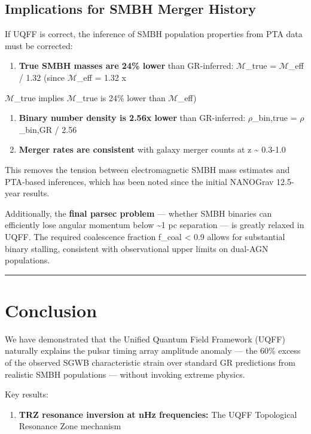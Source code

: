 \documentclass[12pt,a4paper]{article}
\begin{document}
\subsection{Implications for SMBH Merger History}

If UQFF is correct, the inference of SMBH population properties from PTA data must be corrected:

\begin{enumerate}
  \item \textbf{True SMBH masses are 24\% lower} than GR-inferred: $\mathcal{M}$\_true = $\mathcal{M}$\_eff / 1.32 (since $\mathcal{M}$\_eff = 1.32 x
\end{enumerate}

$\mathcal{M}$\_true implies $\mathcal{M}$\_true is 24\% lower than $\mathcal{M}$\_eff)

\begin{enumerate}
  \item \textbf{Binary number density is 2.56x lower} than GR-inferred: $\rho$\_bin,true = $\rho$\_bin,GR / 2.56
  \item \textbf{Merger rates are consistent} with galaxy merger counts at z \textasciitilde{} 0.3-1.0
\end{enumerate}

This removes the tension between electromagnetic SMBH mass estimates and PTA-based inferences, which has been noted since the initial NANOGrav 12.5-year results.

Additionally, the \textbf{final parsec problem} --- whether SMBH binaries can efficiently lose angular momentum below \textasciitilde{}1 pc separation --- is greatly relaxed in UQFF. The required coalescence fraction f\_coal < 0.9 allows for substantial binary stalling, consistent with observational upper limits on dual-AGN populations.

\medskip\hrule\medskip

\section{Conclusion}

We have demonstrated that the Unified Quantum Field Framework (UQFF) naturally explains the pulsar timing array amplitude anomaly --- the 60\% excess of the observed SGWB characteristic strain over standard GR predictions from realistic SMBH populations --- without invoking extreme physics.

Key results:

\begin{enumerate}
  \item \textbf{TRZ resonance inversion at nHz frequencies:} The UQFF Topological Resonance Zone mechanism
\end{enumerate}
\end{document}
